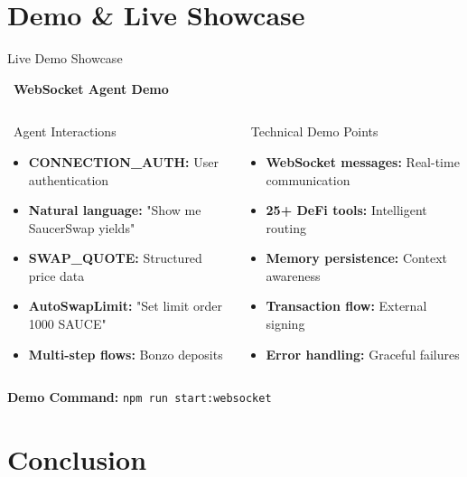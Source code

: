 \documentclass[aspectratio=169]{beamer}
\begin{document}
\section{Demo \& Live Showcase}

\begin{frame}{Live Demo Showcase}
\begin{center}
\large \faPlay\ \textbf{WebSocket Agent Demo}
\end{center}

\vspace{0.05cm}

\begin{columns}
\begin{block}{\faDesktop\ Agent Interactions}
\begin{itemize}
\item \textbf{CONNECTION\_AUTH:} User authentication
\item \textbf{Natural language:} "Show me SaucerSwap yields"
\item \textbf{SWAP\_QUOTE:} Structured price data
\item \textbf{AutoSwapLimit:} "Set limit order 1000 SAUCE"
\item \textbf{Multi-step flows:} Bonzo deposits
\end{itemize}
\end{block}

\begin{block}{\faCode\ Technical Demo Points}
\begin{itemize}
\item \textbf{WebSocket messages:} Real-time communication
\item \textbf{25+ DeFi tools:} Intelligent routing
\item \textbf{Memory persistence:} Context awareness
\item \textbf{Transaction flow:} External signing
\item \textbf{Error handling:} Graceful failures
\end{itemize}
\end{block}
\end{columns}

\vspace{0.05cm}
\begin{center}
\footnotesize \textbf{Demo Command:} \texttt{npm run start:websocket}
\end{center}
\end{frame}

\section{Conclusion}
\end{document}
